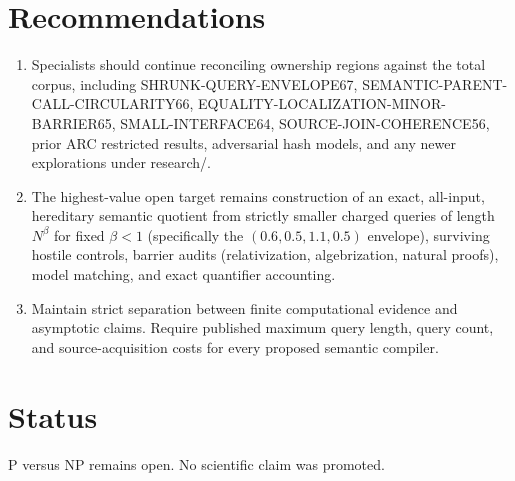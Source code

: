 \documentclass[11pt]{article}
\begin{document}
\section{Recommendations}
\begin{enumerate}
\item Specialists should continue reconciling ownership regions against the total corpus, including SHRUNK-QUERY-ENVELOPE67, SEMANTIC-PARENT-CALL-CIRCULARITY66, EQUALITY-LOCALIZATION-MINOR-BARRIER65, SMALL-INTERFACE64, SOURCE-JOIN-COHERENCE56, prior ARC restricted results, adversarial hash models, and any newer explorations under research/.
\item The highest-value open target remains construction of an exact, all-input, hereditary semantic quotient from strictly smaller charged queries of length $N^\beta$ for fixed $\beta<1$ (specifically the $(0.6,0.5,1.1,0.5)$ envelope), surviving hostile controls, barrier audits (relativization, algebrization, natural proofs), model matching, and exact quantifier accounting.
\item Maintain strict separation between finite computational evidence and asymptotic claims. Require published maximum query length, query count, and source-acquisition costs for every proposed semantic compiler.
\end{enumerate}

\section{Status}
P versus NP remains open. No scientific claim was promoted.

\end{document}

